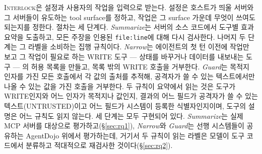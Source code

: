 \documentclass[acmsmall,screen,review,anonymous]{acmart}
\begin{document}
\textsc{Interlock}은 설정과 사용자의 작업을 입력으로 받는다. 설정은 호스트가 띄울 서버와 그 서버들이 유도하는 tool surface를 정하고, 작업은 그 surface 가운데 무엇이 쓰여도 되는지를 정한다. 절차는 세 단계다. \emph{Summarize}는 서버의 소스 코드에서 도구별 효과 요약을 도출하고, 모든 주장을 인용된 \texttt{file:line}에 대해 다시 검사한다. 나머지 두 단계는 그 라벨을 소비하는 집행 규칙이다. \emph{Narrow}는 에이전트의 첫 턴 이전에 작업만 보고 그 작업이 필요로 하는 WRITE 도구 --- 상태를 바꾸거나 데이터를 내보내는 도구 --- 의 허용 목록을 만들고, 목록 밖의 WRITE 호출을 거부한다. \emph{Guard}는 목적지 인자를 가진 모든 호출에서 각 값의 출처를 추적해, 공격자가 쓸 수 있는 텍스트에서만 나올 수 있는 값을 가진 호출을 거부한다. 두 규칙이 요약에서 읽는 것은 도구가 WRITE인지와 어느 인자가 목적지나 값인지, 결과의 어느 필드가 공격자가 쓸 수 있는 텍스트(UNTRUSTED)이고 어느 필드가 시스템이 등록한 식별자인지이며, 도구의 설명은 어느 규칙도 읽지 않는다. 세 단계는 모두 구현되어 있다. \emph{Summarize}는 실제 MCP 서버를 대상으로 평가하고(\S\ref{sec:rq1}), \emph{Narrow}와 \emph{Guard}는 선행 시스템들이 공유하는 AgentDojo 위에서 평가하는데, 거기서 두 규칙이 읽는 라벨은 모델이 도구 코드에서 분류하고 적대적으로 재검사한 것이다(\S\ref{sec:rq2}).
\end{document}
